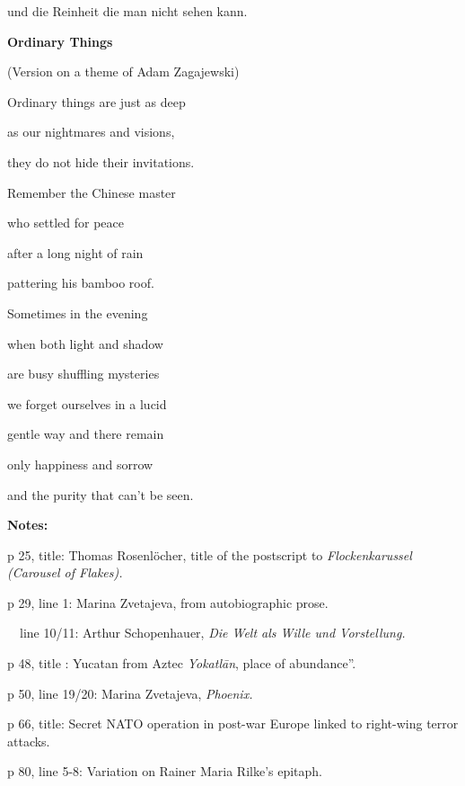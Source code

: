 \documentclass[a4paper]{article}
\begin{document}
und die Reinheit die man nicht sehen kann.

\clearpage
\bigskip

{\bfseries
Ordinary Things}

(Version on a theme of Adam Zagajewski)


\bigskip


\bigskip

Ordinary things are just as deep

as our nightmares and visions,

they do not hide their invitations.


\bigskip

Remember the Chinese master

who settled for peace

after a long night of rain

pattering his bamboo roof.


\bigskip

Sometimes in the evening

when both light and shadow

are busy shuffling mysteries


\bigskip

we forget ourselves in a lucid

gentle way and there remain 

only happiness and sorrow

and the purity that can’t be seen.


\bigskip

\clearpage
\bigskip

{\bfseries
Notes:}


\bigskip

p 25, title: Thomas Rosenlöcher, title of the postscript to \textit{Flockenkarussel (Carousel of Flakes).}

p 29, line 1: Marina Zvetajeva, from autobiographic prose.

\ \ line 10/11: Arthur Schopenhauer, \textit{Die Welt als Wille und Vorstellung.}

{\color{black}
p 48, title : {\textquotedbl}Yucatan{\textquotedbl} from Aztec \textit{Yokatl\=an}, {\textquotedbl}place of abundance”.}

p 50, line 19/20: Marina Zvetajeva, \textit{Phoenix. }

p 66, title: Secret NATO operation in post-war Europe linked to right-wing terror attacks.

p 80, line 5-8: Variation on Rainer Maria Rilke’s epitaph.
\end{document}

